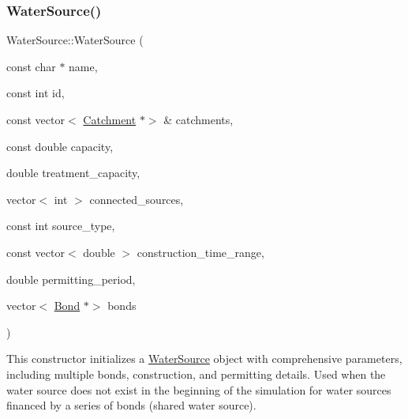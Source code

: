 \subsubsection{\texorpdfstring{Water\+Source()}{WaterSource()}\hspace{0.1cm}{\footnotesize\ttfamily [4/8]}}
{\footnotesize\ttfamily Water\+Source\+::\+Water\+Source (\begin{DoxyParamCaption}\item[{const char $\ast$}]{name,  }\item[{const int}]{id,  }\item[{const vector$<$ \mbox{\hyperlink{classCatchment}{Catchment}} $\ast$$>$ \&}]{catchments,  }\item[{const double}]{capacity,  }\item[{double}]{treatment\+\_\+capacity,  }\item[{vector$<$ int $>$}]{connected\+\_\+sources,  }\item[{const int}]{source\+\_\+type,  }\item[{const vector$<$ double $>$}]{construction\+\_\+time\+\_\+range,  }\item[{double}]{permitting\+\_\+period,  }\item[{vector$<$ \mbox{\hyperlink{classBond}{Bond}} $\ast$$>$}]{bonds }\end{DoxyParamCaption})}



This constructor initializes a {\ttfamily \mbox{\hyperlink{classWaterSource}{Water\+Source}}} object with comprehensive parameters, including multiple bonds, construction, and permitting details. Used when the water source does not exist in the beginning of the simulation for water sources financed by a series of bonds (shared water source). 



